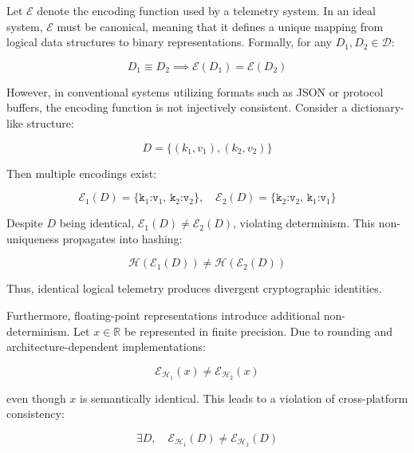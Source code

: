 Let $\mathcal{E}$ denote the encoding function used by a telemetry system. In an ideal system, $\mathcal{E}$ must be canonical, meaning that it defines a unique mapping from logical data structures to binary representations. Formally, for any $D_1, D_2 \in \mathcal{D}$:

\begin{equation}
D_1 \equiv D_2 \implies \mathcal{E}(D_1) = \mathcal{E}(D_2)
\end{equation}

However, in conventional systems utilizing formats such as JSON or protocol buffers, the encoding function is not injectively consistent. Consider a dictionary-like structure:

\begin{equation}
D = \{(k_1, v_1), (k_2, v_2)\}
\end{equation}

Then multiple encodings exist:

\begin{equation}
\mathcal{E}_1(D) = \texttt{\{k$_1$:v$_1$, k$_2$:v$_2$\}}, \quad
\mathcal{E}_2(D) = \texttt{\{k$_2$:v$_2$, k$_1$:v$_1$\}}
\end{equation}

Despite $D$ being identical, $\mathcal{E}_1(D) \neq \mathcal{E}_2(D)$, violating determinism. This non-uniqueness propagates into hashing:

\begin{equation}
\mathcal{H}(\mathcal{E}_1(D)) \neq \mathcal{H}(\mathcal{E}_2(D))
\end{equation}

Thus, identical logical telemetry produces divergent cryptographic identities.

Furthermore, floating-point representations introduce additional non-determinism. Let $x \in \mathbb{R}$ be represented in finite precision. Due to rounding and architecture-dependent implementations:

\begin{equation}
\mathcal{E}_{\mathcal{H}_1}(x) \neq \mathcal{E}_{\mathcal{H}_2}(x)
\end{equation}

even though $x$ is semantically identical. This leads to a violation of cross-platform consistency:

\begin{equation}
\exists D, \quad \mathcal{E}_{\mathcal{H}_1}(D) \neq \mathcal{E}_{\mathcal{H}_2}(D)
\end{equation}

